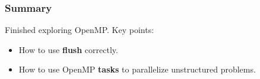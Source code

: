 \documentclass[aspectratio=43]{beamer}
\newenvironment{changemargin}[1]{%
  \begin{list}{}{%
    \setlength{\topsep}{0pt}%
    \setlength{\leftmargin}{#1}%
    \setlength{\rightmargin}{1em}
    \setlength{\listparindent}{\parindent}%
    \setlength{\itemindent}{\parindent}%
    \setlength{\parsep}{\parskip}%
  }%
  \item[]}{\end{list}}
\begin{document}
\begin{frame}
  \frametitle{Summary}

  \begin{changemargin}{1.5cm}
    Finished exploring OpenMP. Key points:
  \begin{itemize}
    \item How to use {\bf flush} correctly.
    \item How to use OpenMP {\bf tasks} to parallelize unstructured problems.
  \end{itemize}
  \end{changemargin}
\end{frame}
\end{document}
